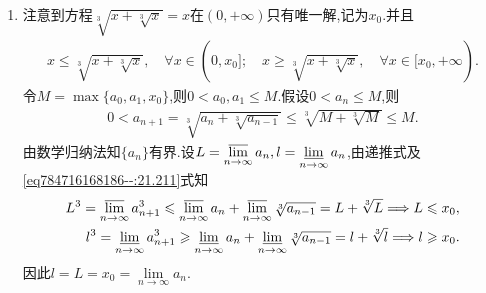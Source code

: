 \documentclass[../../main.tex]{subfiles}%
\begin{document}
\begin{solution}
\begin{enumerate}
\item 注意到方程$\sqrt[3]{x+\sqrt[3]{x}}=x$在$(0,+\infty)$只有唯一解,记为$x_0$.并且
\begin{align}
x\leqslant \sqrt[3]{x+\sqrt[3]{x}},\quad \forall x\in (0,x_0];\quad x\geqslant \sqrt[3]{x+\sqrt[3]{x}},\quad \forall x\in [x_0,+\infty).\label{eq784716168186--:21.211}
\end{align}
令$M=\max \{a_0,a_1,x_0\}$,则$0<a_0,a_1\leqslant M$.假设$0<a_n\leqslant M$,则
\begin{align*}
0<a_{n+1}=\sqrt[3]{a_n+\sqrt[3]{a_{n-1}}}\leqslant \sqrt[3]{M+\sqrt[3]{M}}\leqslant M.
\end{align*}
由数学归纳法知$\{a_n\}$有界.设$L=\varlimsup\limits_{n\rightarrow \infty}a_n,l=\varliminf\limits_{n\rightarrow \infty}a_n$,由递推式及\eqref{eq784716168186--:21.211}式知
\begin{align*}
L^3=\varlimsup\limits_{n\rightarrow \infty}a_{n+1}^3\leqslant \varlimsup\limits_{n\rightarrow \infty}a_n+\varlimsup\limits_{n\rightarrow \infty}\sqrt[3]{a_{n-1}}=L+\sqrt[3]{L}\Longrightarrow L\leqslant x_0,
\\
l^3=\varliminf\limits_{n\rightarrow \infty}a_{n+1}^3\geqslant \varliminf\limits_{n\rightarrow \infty}a_n+\varliminf\limits_{n\rightarrow \infty}\sqrt[3]{a_{n-1}}=l+\sqrt[3]{l}\Longrightarrow l\geqslant x_0.
\end{align*}
因此$l=L=x_0=\lim\limits_{n\rightarrow \infty}a_n$.
\end{enumerate}

\end{solution}
\end{document}

